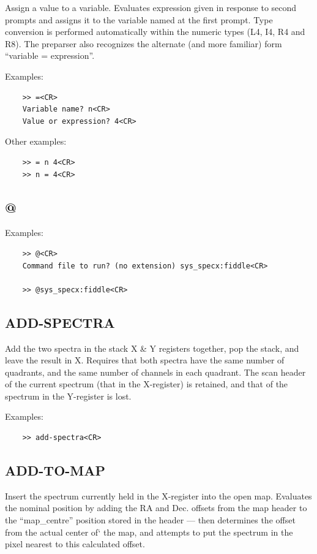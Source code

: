 \documentclass[11pt,twoside]{report}
\begin{document}
Assign a value to a variable. Evaluates expression given in response to
second prompts and assigns it to the variable named at the first prompt.
Type conversion is performed automatically within the numeric types (L4, I4,
R4 and R8). The preparser also recognizes the alternate (and more familiar)
form ``variable = expression''.

Examples:
\begin{verbatim}
    >> =<CR>
    Variable name? n<CR>
    Value or expression? 4<CR>
\end{verbatim}
Other examples:
\begin{verbatim}
    >> = n 4<CR>
    >> n = 4<CR>
\end{verbatim}

\subsection{@}  
Examples:
\begin{verbatim}
    >> @<CR>
    Command file to run? (no extension) sys_specx:fiddle<CR>

    >> @sys_specx:fiddle<CR>
\end{verbatim}

\subsection{ADD-SPECTRA} 

Add the two spectra in the stack X \& Y registers together, pop the stack,
and leave the result in X. Requires that both spectra have the same number
of quadrants, and the same number of channels in each quadrant. The scan 
header of the current spectrum (\ie that in the X-register) is retained,
and that of the spectrum in the Y-register is lost.

Examples:
\begin{verbatim}
    >> add-spectra<CR>
\end{verbatim}

\subsection{ADD-TO-MAP} 

Insert the spectrum currently held in the X-register into the open map.
Evaluates the nominal position by adding the RA and Dec. offsets from the
map header to the ``map\_centre'' position stored in the header --- then
determines the offset from the actual center of` the map, and attempts to
put the spectrum in the pixel nearest to this calculated offset. 
\end{document}
